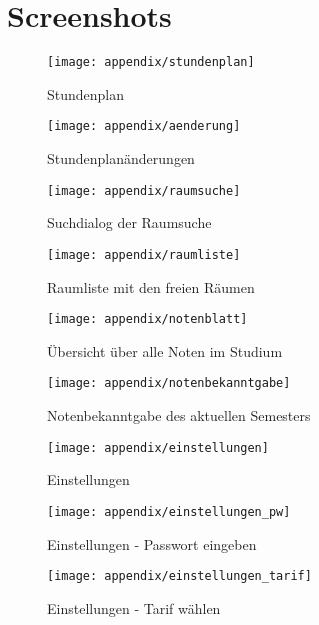 \documentclass{article}
\begin{document}
\section{Screenshots}
\begin{appendices}
	\begin{figure}
		\centering
		\texttt{[image: appendix/stundenplan]}
		\caption{Stundenplan}
	\end{figure}
	\begin{figure}
		\centering
		\texttt{[image: appendix/aenderung]}
		\caption{Stundenplanänderungen}
	\end{figure}
	\begin{figure}
		\centering
		\texttt{[image: appendix/raumsuche]}
		\caption{Suchdialog der Raumsuche}
	\end{figure}
	\begin{figure}
		\centering
		\texttt{[image: appendix/raumliste]}
		\caption{Raumliste mit den freien Räumen}
	\end{figure}
	\begin{figure}
		\centering
		\texttt{[image: appendix/notenblatt]}
		\caption{Übersicht über alle Noten im Studium}
	\end{figure}
	\begin{figure}
		\centering
		\texttt{[image: appendix/notenbekanntgabe]}
		\caption{Notenbekanntgabe des aktuellen Semesters}
	\end{figure}
	\begin{figure}
		\centering
		\texttt{[image: appendix/einstellungen]}
		\caption{Einstellungen}
	\end{figure}
	\begin{figure}
		\centering
		\texttt{[image: appendix/einstellungen\_pw]}
		\caption{Einstellungen - Passwort eingeben}
	\end{figure}
	\begin{figure}
		\centering
		\texttt{[image: appendix/einstellungen\_tarif]}
		\caption{Einstellungen - Tarif wählen}
	\end{figure}
	
\end{appendices}
\end{document}
